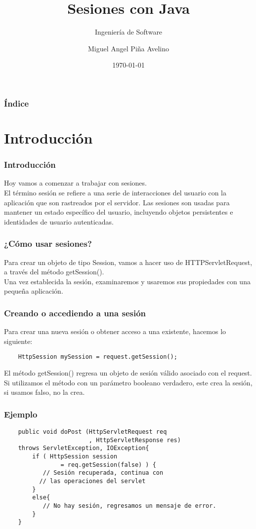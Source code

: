 \documentclass{beamer}
\title[Sesiones]{Sesiones con Java}
\subtitle{Ingeniería de Software}
\author[Miguel]{Miguel Angel Piña Avelino}
\institute[UNAM]{
  Facultad de Ciencias, UNAM
}
\date{\today}
\begin{document}
\frame{\titlepage}

\begin{frame}
  \frametitle{Índice}
  \tableofcontents
\end{frame}

\section{Introducción}
\begin{frame}
  \frametitle{Introducción}
  Hoy vamos a comenzar a trabajar con sesiones.\\
  El término sesión se refiere a una serie de interacciones del usuario con la
  aplicación que son rastreados por el servidor. Las sesiones son usadas para
  mantener un estado específico del usuario, incluyendo objetos persistentes
  e identidades de usuario autenticadas.
\end{frame}

\begin{frame}
  \frametitle{¿Cómo usar sesiones?}
  Para crear un objeto de tipo Session, vamos a hacer uso de HTTPServletRequest,
  a través del método getSession().\\
  Una vez establecida la sesión, examinaremos y usaremos sus propiedades con una
  pequeña aplicación.
\end{frame}

\begin{frame}[fragile]
  \frametitle{Creando o accediendo a una sesión}
  Para crear una nueva sesión o obtener acceso a una existente, hacemos lo
  siguiente:
  \begin{verbatim}
    HttpSession mySession = request.getSession();
  \end{verbatim}
  El método getSession() regresa un objeto de sesión válido asociado con el
  request. Si utilizamos el método con un parámetro booleano verdadero, este
  crea la sesión, si usamos falso, no la crea.
\end{frame}

\begin{frame}[fragile]
  \frametitle{Ejemplo}
  \begin{verbatim}
    public void doPost (HttpServletRequest req
                        , HttpServletResponse res)
    throws ServletException, IOException{
        if ( HttpSession session
                = req.getSession(false) ) {
           // Sesión recuperada, continua con
          // las operaciones del servlet
        }
        else{
           // No hay sesión, regresamos un mensaje de error.
        }
    }
  \end{verbatim}
\end{frame}
\end{document}
